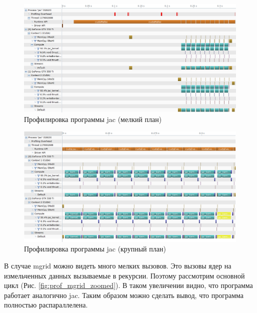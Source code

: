 \documentclass[12pt, a4paper]{article}
\begin{document}
        \begin{figure}[H]
            \centering
            \caption{Профилировка программы jac (мелкий план)}
            \label{fig:prof_jac}
            \includegraphics[width=\textwidth]{pics/prof_jac}
        \end{figure}
        \begin{figure}[H]
            \centering
            \caption{Профилировка программы jac (крупный план)}
            \label{fig:prof_jac_zoomed}
            \includegraphics[width=\textwidth]{pics/prof_jac_zoomed}
        \end{figure}

        В случае mgrid можно видеть много мелких вызовов. Это вызовы ядер на измельченных данных вызываемые в рекурсии. Поэтому рассмотрим основной цикл (Рис. \ref{fig:prof_mgrid_zoomed}). В таком увеличении видно, что программа работает аналогично jac. Таким образом можно сделать вывод, что программа полностью распараллелена.
\end{document}
